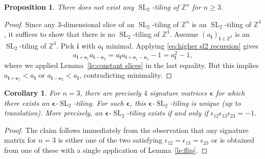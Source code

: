 \documentclass[12pt]{amsart}
\newtheorem{corollary}[theorem]{Corollary}
\newtheorem{proposition}[theorem]{Proposition}
\newcommand{\bepsilon}{\boldsymbol{\epsilon}}
\newcommand{\be}{\boldsymbol{e}}
\newcommand{\bi}{\boldsymbol{i}}
\newcommand{\SL}{\operatorname{SL}}
\newcommand{\ZZ}{\mathbb{Z}}
\begin{document}
  \begin{proposition}\label{pr:nonexistence}
    There does not exist any $\SL_2$-tiling of $\ZZ^n$ for $n\geq3$.
  \end{proposition}
  \begin{proof}
    Since any $3$-dimensional slice of an $\SL_2$-tiling of $\ZZ^n$ is an $\SL_2$-tiling of $\ZZ^3$, it suffices to show that there is no $\SL_2$-tiling of $\ZZ^3$.
    Assume $(a_{\bi})_{\bi\in\ZZ^3}$ is an $\SL_2$-tiling of $\ZZ^3$.
    Pick $\bi$ with $a_{\bi}$ minimal.
    Applying \eqref{eq:higher sl2 recursion} gives
    \[
      a_{\bi+\be_1}a_{\bi-\be_2}=a_{\bi}a_{\bi+\be_1-\be_2}-1=a_{\bi}^2-1,
    \]
    where we applied Lemma~\ref{le:constant slices} in the last equality.
    But this implies $a_{\bi+\be_1}<a_{\bi}$ or $a_{\bi-\be_2}<a_{\bi}$, contradicting minimality.
  \end{proof}

  \begin{corollary}\label{co:n=3}
    For $n=3$, there are precisely $4$ signature matrices $\bepsilon$ for which there exists an $\bepsilon$-$\SL_2$-tiling. 
    For such $\bepsilon$, this $\bepsilon$-$\SL_2$-tiling is unique (up to translation).
    More precisely, an $\bepsilon$-$\SL_2$-tiling exists if and only if $\epsilon_{12}\epsilon_{13}\epsilon_{23}=-1$.
  \end{corollary}
  \begin{proof}
    The claim follows immediately from the observation that any signature matrix for $n=3$ is either one of the two satisfying $\epsilon_{12}=\epsilon_{13}=\epsilon_{23}$ or is obtained from one of these with a single application of Lemma~\ref{le:flip}.
  \end{proof}
\end{document}
